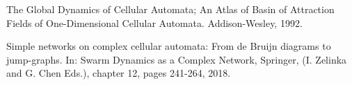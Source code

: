\documentclass[11pt]{article}
\begin{document}
\begin{thebibliography}{1}
  The Global Dynamics of Cellular Automata; An Atlas of Basin of Attraction Fields of One-Dimensional Cellular Automata. Addison-Wesley, 1992. 

  Simple networks on complex cellular automata: From de Bruijn diagrams to jump-graphs. In: Swarm Dynamics as a Complex Network, Springer, (I. Zelinka and G. Chen Eds.), chapter 12, pages 241-264, 2018.
\end{thebibliography}
\end{document}
